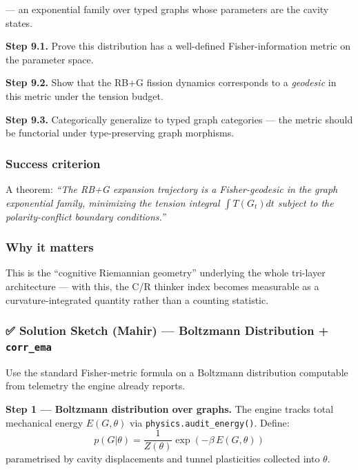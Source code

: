\documentclass[
  11pt,
  a4paper,
]{article}
\begin{document}
--- an exponential family over typed graphs whose parameters are the
cavity states.

\textbf{Step 9.1.} Prove this distribution has a well-defined
Fisher-information metric on the parameter space.

\textbf{Step 9.2.} Show that the RB+G fission dynamics corresponds to a
\emph{geodesic} in this metric under the tension budget.

\textbf{Step 9.3.} Categorically generalize to typed graph categories
--- the metric should be functorial under type-preserving graph
morphisms.

\subsubsection{Success criterion}\label{success-criterion-8}

A theorem: \emph{``The RB+G expansion trajectory is a Fisher-geodesic in
the graph exponential family, minimizing the tension integral
\(\int T(G_t) dt\) subject to the polarity-conflict boundary
conditions.''}

\subsubsection{Why it matters}\label{why-it-matters-1}

This is the ``cognitive Riemannian geometry'' underlying the whole
tri-layer architecture --- with this, the C/R thinker index becomes
measurable as a curvature-integrated quantity rather than a counting
statistic.

\subsubsection{\texorpdfstring{✅ Solution Sketch (Mahir) --- Boltzmann
Distribution +
\texttt{corr\_ema}}{✅ Solution Sketch (Mahir) --- Boltzmann Distribution + corr\_ema}}\label{solution-sketch-mahir-boltzmann-distribution-corr_ema}

Use the standard Fisher-metric formula on a Boltzmann distribution
computable from telemetry the engine already reports.

\textbf{Step 1 --- Boltzmann distribution over graphs.} The engine
tracks total mechanical energy \(E(G, \theta)\) via
\texttt{physics.audit\_energy()}. Define: \[
p(G | \theta) = \frac{1}{Z(\theta)} \exp\!\left(-\beta \, E(G, \theta)\right)
\] parametrised by cavity displacements and tunnel plasticities
collected into \(\theta\).
\end{document}
